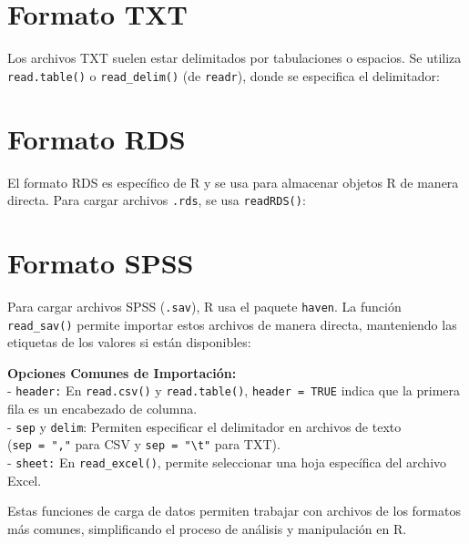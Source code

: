 \documentclass[
]{book}
\begin{document}
\hypertarget{formato-txt}{%
\section{Formato TXT}\label{formato-txt}}

Los archivos TXT suelen estar delimitados por tabulaciones o espacios. Se utiliza \texttt{read.table()} o \texttt{read\_delim()} (de \texttt{readr}), donde se especifica el delimitador:

\hypertarget{formato-rds}{%
\section{Formato RDS}\label{formato-rds}}

El formato RDS es específico de R y se usa para almacenar objetos R de manera directa. Para cargar archivos \texttt{.rds}, se usa \texttt{readRDS()}:

\hypertarget{formato-spss}{%
\section{Formato SPSS}\label{formato-spss}}

Para cargar archivos SPSS (\texttt{.sav}), R usa el paquete \texttt{haven}. La función \texttt{read\_sav()} permite importar estos archivos de manera directa, manteniendo las etiquetas de los valores si están disponibles:

\textbf{Opciones Comunes de Importación:}\\
- \texttt{header:} En \texttt{read.csv()} y \texttt{read.table()}, \texttt{header\ =\ TRUE} indica que la primera fila es un encabezado de columna.\\
- \texttt{sep} y \texttt{delim}: Permiten especificar el delimitador en archivos de texto (\texttt{sep\ =\ ","} para CSV y \texttt{sep\ =\ "\textbackslash{}t"} para TXT).\\
- \texttt{sheet:} En \texttt{read\_excel()}, permite seleccionar una hoja específica del archivo Excel.

Estas funciones de carga de datos permiten trabajar con archivos de los formatos más comunes, simplificando el proceso de análisis y manipulación en R.

  
\end{document}
